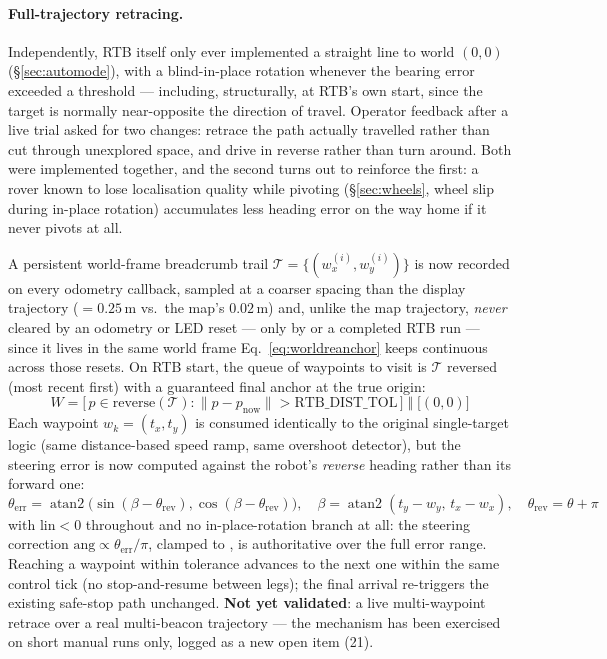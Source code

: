 \paragraph{Full-trajectory retracing.} Independently, RTB itself only ever
implemented a straight line to world $(0,0)$ (\S\ref{sec:automode}), with a
blind-in-place rotation whenever the bearing error exceeded a threshold —
including, structurally, at RTB's own start, since the target is normally
near-opposite the direction of travel. Operator feedback after a live trial
asked for two changes: retrace the path actually travelled rather than cut
through unexplored space, and drive in reverse rather than turn around.
Both were implemented together, and the second turns out to reinforce the
first: a rover known to lose localisation quality while pivoting
(\S\ref{sec:wheels}, wheel slip during in-place rotation) accumulates less
heading error on the way home if it never pivots at all.

A persistent world-frame breadcrumb trail
$\mathcal{T} = \{(w_x^{(i)}, w_y^{(i)})\}$ is now recorded on every odometry
callback, sampled at a coarser spacing than the display trajectory
($=0.25$\,m vs.\ the map's $0.02$\,m) and, unlike
the map trajectory, \emph{never} cleared by an odometry or LED reset — only
by  or a completed RTB run — since it lives in the same
world frame Eq.~\ref{eq:worldreanchor} keeps continuous across those resets.
On RTB start, the queue of waypoints to visit is $\mathcal{T}$ reversed
(most recent first) with a guaranteed final anchor at the true origin:
\begin{equation}
  W = \big[\, p \in \text{reverse}(\mathcal{T}) : \lVert p - p_{\text{now}}
  \rVert > \text{RTB\_DIST\_TOL} \,\big] \;\Vert\; \big[(0,0)\big]
  \label{eq:rtbwaypoints}
\end{equation}
Each waypoint $w_k=(t_x,t_y)$ is consumed identically to the original
single-target logic (same distance-based speed ramp, same overshoot
detector), but the steering error is now computed against the robot's
\emph{reverse} heading rather than its forward one:
\begin{equation}
  \theta_{\text{err}} = \operatorname{atan2}\!\big(\sin(\beta-\theta_{\text{rev}}),
  \cos(\beta-\theta_{\text{rev}})\big), \quad
  \beta=\operatorname{atan2}(t_y-w_y,\,t_x-w_x), \quad
  \theta_{\text{rev}}=\theta+\pi
  \label{eq:rtbreverse}
\end{equation}
with $\text{lin} < 0$ throughout and no in-place-rotation branch at all: the
steering correction $\text{ang}\propto\theta_{\text{err}}/\pi$, clamped to
, is authoritative over the full error range. Reaching
a waypoint within tolerance advances to the next one within the same control
tick (no stop-and-resume between legs); the final arrival re-triggers the
existing safe-stop path unchanged. \textbf{Not yet validated}: a live
multi-waypoint retrace over a real multi-beacon trajectory — the mechanism
has been exercised on short manual runs only, logged as a new open item (21).

